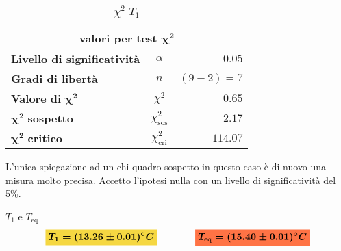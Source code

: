 \documentclass{article}
\newcommand{\giallo}[1]{\colorbox{myyellow}{$\displaystyle #1$}}
\newcommand{\rosso}[1]{\colorbox{myred}{$\displaystyle #1$}}
\begin{document}
	
	\begin{table}[H] \centering
		\begin{small}
			\begin{tabular}{@{}lcr@{}}\toprule
				\multicolumn{3}{c}{\textbf{valori per test} \(\boldsymbol{\chi^2}\)}\\ \midrule
				\textbf{Livello di significatività}		 &  \(\alpha\) &\(0.05\)\footnotemark \\  \hdashline
				\textbf{Gradi di libertà}		 & \(n\)  &\((9-2) = 7\) \\   \hdashline
				\textbf{Valore di} \(\boldsymbol{\chi^2}\)	 & \(\chi^2\)  &\(0.65\)\\  \hdashline
				\(\boldsymbol{\chi^2}\) \textbf{sospetto}		& \(\chi^2_{\text{sos}}\)  &\(2.17\)\\ \hdashline
				\(\boldsymbol{\chi^2}\) \textbf{critico}		& \(\chi^2_{\text{cri}}\)  &\(114.07\)\\ 
				\bottomrule
			\end{tabular}
		\end{small}
		\caption{\(\chi^2\) \(T_{1}\)}
	\end{table}
	
	\noindent
	L'unica spiegazione ad un chi quadro sospetto in questo caso è di nuovo una misura molto precisa. Accetto l'ipotesi nulla con un livello di significatività del 5\%.
	
	\begin{es}{\(T_{1}\) e \(T_{\text{eq}}\)}
		\[ 
		\giallo{\boldsymbol{T_{1} = (13.26	\pm 0.01)^\circ C}}\qquad \qquad \rosso{\boldsymbol{T_{\text{eq}} = (15.40	\pm 0.01)^\circ C}}
		\]
	\end{es}
	
\end{document}
